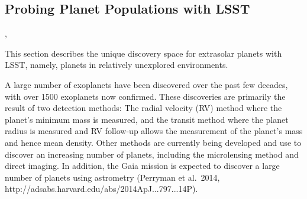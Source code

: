%
%

\subsection{Probing Planet Populations with LSST}
\def\secname{planets}\label{sec:\secname}

,

This section describes the unique discovery space for
extrasolar planets with LSST, namely,
planets in relatively unexplored environments.


A large number of exoplanets have been discovered over the past few
decades, with over 1500 exoplanets now confirmed. These discoveries are
primarily the result of two detection methods: The radial velocity (RV)
method where the planet's minimum mass is measured, and the transit
method where the planet radius is measured and RV follow-up allows the
measurement of the planet's mass and hence mean density. Other methods
are currently being developed and use to discover an increasing number of
planets, including the microlensing method and direct imaging. In
addition, the Gaia mission is expected to discover a large number of
planets using astrometry (Perryman et al.~2014,
http://adsabs.harvard.edu/abs/2014ApJ...797...14P).

